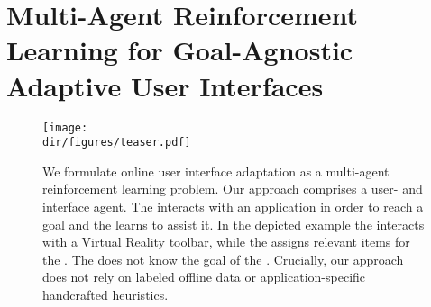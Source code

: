 \chapter{Multi-Agent Reinforcement Learning for Goal-Agnostic Adaptive User
Interfaces}
\label{ch:control:multi}


\contribution{

}

\begin{figure}
    \centering
    \texttt{[image: \\dir/figures/teaser.pdf]}
    \caption{ 
     We formulate online user interface adaptation as a multi-agent reinforcement learning problem. Our approach comprises a user- and interface agent. The \useragent interacts with an application in order to reach a goal and the \interfaceagent learns to assist it. In the depicted example the \useragent interacts with a Virtual Reality toolbar, while the \interfaceagent assigns relevant items for the \useragent. The \interfaceagent does not know the goal of the \useragent. Crucially, our approach does not rely on labeled offline data or application-specific handcrafted heuristics.}
    \label{fig:teaser_rl}
\end{figure}








